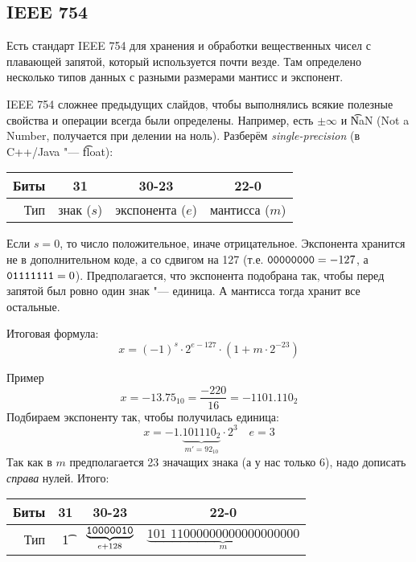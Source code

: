 \subsection{IEEE 754}
\begin{frame}
\end{frame}

\begin{frame}
	Есть стандарт IEEE 754 для хранения и обработки вещественных чисел с плавающей запятой, который используется почти везде.
	Там определено несколько типов данных с разными размерами мантисс и экспонент.

	IEEE 754 сложнее предыдущих слайдов, чтобы выполнялись всякие полезные свойства и операции всегда были определены.
	Например, есть $\pm \infty$ и \t{NaN} (Not a Number, получается при делении на ноль).
	Разберём \textit{single-precision} (в C++/Java "--- \t{float}):

	\begin{center}
		\begin{tabular}{|r|c|c|c|}
			\hline
			Биты & 31 & 30-23 & 22-0 \\\hline
			Тип & знак ($s$) & экспонента ($e$) & мантисса ($m$) \\\hline
		\end{tabular}
	\end{center}
	Если $s=0$, то число положительное, иначе отрицательное.
	Экспонента хранится не в дополнительном коде, а со сдвигом на 127 (т.е. $\t{0000 0000}=-127$, а $\t{0111 1111}=0$).
	Предполагается, что экспонента подобрана так, чтобы перед запятой был ровно один знак "--- единица.
	А мантисса тогда хранит все остальные.

	Итоговая формула:
	\[
		x = (-1)^s \cdot 2^{e-127} \cdot (1 + m \cdot 2^{-23})
	\]
\end{frame}

\begin{frame}{Пример}
	\[
		x = -13.75_{10} = \frac{-220}{16} = -1101.110_2
	\]
	Подбираем экспоненту так, чтобы получилась единица:
	\[
		x = -1.\underbrace{101110_2}_{m'=92_{10}} \cdot 2^3 \quad e=3
	\]
	Так как в $m$ предполагается 23 значащих знака (а у нас только 6), надо дописать \textit{справа} нулей.
	Итого:
	\begin{center}
		\begin{tabular}{|r|c|c|c|}
			\hline
			Биты & 31 & 30-23 & 22-0 \\\hline
			Тип & \t{1} & $\underbrace{\t{100 0001 0}}_{e+128}$ & $\underbrace{\textit{101 110}0 0000 0000 0000 0000}_{m}$ \\\hline
		\end{tabular}
	\end{center}	
\end{frame}
